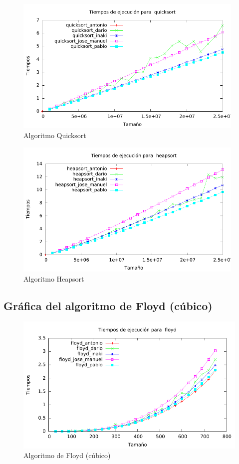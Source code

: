 \documentclass[a4paper, 11pt]{article}
\begin{document}
\begin{figure}[h] \includegraphics[width=11cm]{quicksort_todos_g} \centering
   \caption{Algoritmo Quicksort} \end{figure}

\begin{figure}[h] \includegraphics[width=11cm]{heapsort_todos_g} \centering
   \caption{Algoritmo Heapsort} \end{figure}

\newpage
\subsection{Gráfica del algoritmo de Floyd (cúbico)}
\begin{figure}[h] \includegraphics[width=13cm]{floyd_todos_g} \centering
	\caption{Algoritmo de Floyd (cúbico)} \end{figure}
\end{document}
